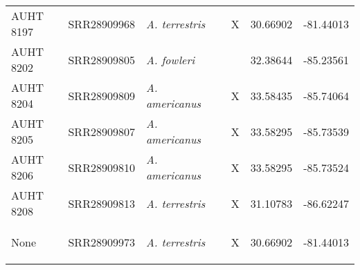 \begin{longtable}{ lllllll }
AUHT 8197 & SRR28909968 & \textit{A. terrestris} &  & X & 30.66902 & -81.44013 \\ 
AUHT 8202 & SRR28909805 & \textit{A. fowleri} &  &  & 32.38644 & -85.23561 \\ 
AUHT 8204 & SRR28909809 & \textit{A. americanus} &  & X & 33.58435 & -85.74064 \\ 
AUHT 8205 & SRR28909807 & \textit{A. americanus} &  & X & 33.58295 & -85.73539 \\ 
AUHT 8206 & SRR28909810 & \textit{A. americanus} &  & X & 33.58295 & -85.73524 \\ 
AUHT 8208 & SRR28909813 & \textit{A. terrestris} &  & X & 31.10783 & -86.62247 \\ 
None & SRR28909973 & \textit{A. terrestris} &  & X & 30.66902 & -81.44013

\label{table:collectedPhylo}
\end{longtable}